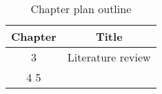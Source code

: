 \begin{table}[h!]
\centering
\begin{tabular}{cc}
{Chapter} & {Title} \\ \midrule
{3} & {Literature review} \\
{4}
{5}
\end{tabular}
\caption{Chapter plan outline}
\label{table:1}
\end{table}